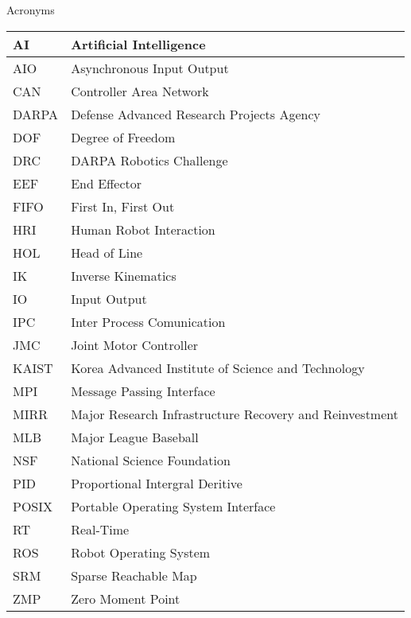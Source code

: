 \Large
\centering
Acronyms\\
\normalsize
\begin{tabular}{l | l}
\hline
AI & Artificial Intelligence\\
\hline
AIO & Asynchronous Input Output\\
\hline
CAN & Controller Area Network \\
\hline
DARPA  &  Defense Advanced Research Projects Agency\\
\hline 
DOF & Degree of Freedom \\
\hline
DRC  & DARPA Robotics Challenge \\
\hline
EEF  & End Effector\\
\hline
FIFO & First In, First Out\\
\hline
HRI & Human Robot Interaction\\
\hline
HOL & Head of Line\\
\hline
IK & Inverse Kinematics\\ 
\hline
IO & Input Output\\
\hline
IPC & Inter Process Comunication \\
\hline
JMC & Joint Motor Controller\\
\hline
KAIST & Korea Advanced Institute of Science and Technology \\
\hline
MPI & Message Passing Interface\\
\hline
MIRR & Major Research Infrastructure Recovery and Reinvestment\\
\hline
MLB & Major League Baseball\\
\hline
NSF & National Science Foundation \\
\hline
PID & Proportional Intergral Deritive\\
\hline
POSIX & Portable Operating System Interface\\
\hline
RT & Real-Time\\
\hline
ROS & Robot Operating System\\
\hline
SRM & Sparse Reachable Map \\
\hline 
ZMP & Zero Moment Point\\
\hline
\end{tabular}
